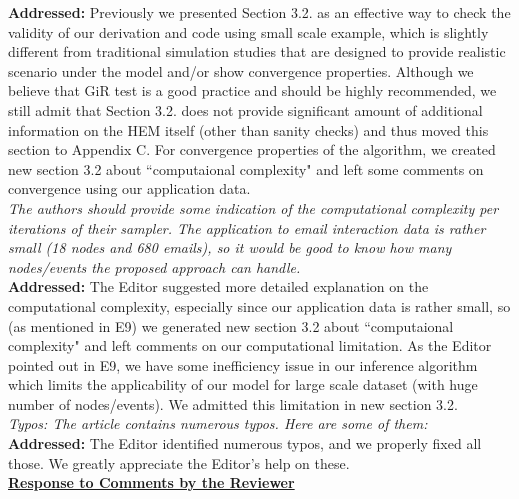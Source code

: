 \documentclass[12pt]{article}
\newcommand{\grey}[1]{{\color{mygrey}#1}}
\theoremstyle{definition}
\begin{document}
\noindent \textcolor{MyGreen}{\textbf{Addressed:}} Previously we presented Section 3.2. as an effective way to check the validity of our derivation and code using small scale example, which is slightly different from traditional simulation studies that are designed to provide realistic scenario under the model and/or show convergence properties. Although we believe that GiR test is a good practice and should be highly recommended, we still admit that Section 3.2. does not provide significant amount of additional information on the HEM itself (other than sanity checks) and thus moved this section to Appendix C. For convergence properties of the algorithm, we created new section 3.2 about ``computaional complexity" and left some comments on convergence using our application data.\\



 \grey{\emph{The authors should provide some indication of the computational complexity per iterations of their sampler. The application to email interaction data is rather small (18 nodes and 680 emails), so it would be good to know how many nodes/events the proposed approach can handle.}}\\

\noindent \textcolor{MyGreen}{\textbf{Addressed:}} The Editor suggested more detailed explanation on the computational complexity, especially since our application data is rather small, so (as mentioned in E9) we generated new section 3.2 about ``computaional complexity" and left comments on our computational limitation. As the Editor pointed out in E9, we have some inefficiency issue in our inference algorithm which limits the applicability of our model for large scale dataset (with huge number of nodes/events). We admitted this limitation in new section 3.2.\\



 \grey{\emph{Typos: The article contains numerous typos. Here are some of them:}}\\

\noindent \textcolor{MyGreen}{\textbf{Addressed:}} The Editor identified numerous typos, and we properly fixed all those. We greatly appreciate the Editor's help on these.\\



\noindent \underline{\textbf{Response to Comments by the Reviewer}}\\
\end{document}
